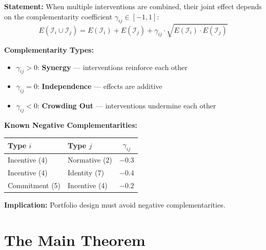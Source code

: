 \begin{tcolorbox}[colback=gray!5!white, colframe=gray!75!black,
    title=EIH Condition 3: Portfolio Complementarity (from HHH Axiom HHH-4)]

\textbf{Statement:} When multiple interventions are combined, their joint effect
depends on the complementarity coefficient $\gamma_{ij} \in [-1, 1]$:
\begin{equation}
E(\mathcal{I}_i \cup \mathcal{I}_j) = E(\mathcal{I}_i) + E(\mathcal{I}_j) + \gamma_{ij} \cdot \sqrt{E(\mathcal{I}_i) \cdot E(\mathcal{I}_j)}
\label{eq:gamma-combination}
\end{equation}

\textbf{Complementarity Types:}
\begin{itemize}[nosep]
\item $\gamma_{ij} > 0$: \textbf{Synergy} --- interventions reinforce each other
\item $\gamma_{ij} = 0$: \textbf{Independence} --- effects are additive
\item $\gamma_{ij} < 0$: \textbf{Crowding Out} --- interventions undermine each other
\end{itemize}

\textbf{Known Negative Complementarities:}
\begin{center}
\renewcommand{\arraystretch}{1.2}
\begin{tabular}{@{}llc@{}}
\toprule
\textbf{Type $i$} & \textbf{Type $j$} & \textbf{$\gamma_{ij}$} \\
\midrule
Incentive (4) & Normative (2) & $-0.3$ \\
Incentive (4) & Identity (7) & $-0.4$ \\
Commitment (5) & Incentive (4) & $-0.2$ \\
\bottomrule
\end{tabular}
\end{center}

\textbf{Implication:} Portfolio design must avoid negative complementarities.
\end{tcolorbox}


\section{The Main Theorem}
\label{sec:eih-theorem}

